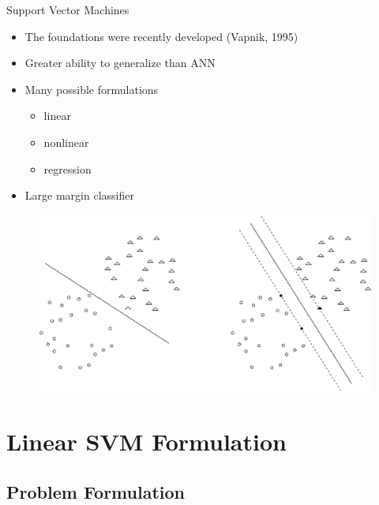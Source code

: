 \documentclass{beamer}
\begin{document}
\begin{frame}{Support Vector Machines}
    \begin{itemize}
        \item The foundations were recently developed (Vapnik, 1995)
        \item Greater ability to generalize than ANN
        \item Many possible formulations
            \begin{itemize}
                \item \alert{linear}
                \item nonlinear
                \item regression
            \end{itemize}
        \item \alert{Large margin} classifier
    \end{itemize}

    \begin{figure}[!htb]
        \centering
        \includegraphics[width=.8\textwidth]{figures/large_margin.eps}
    \end{figure}
\end{frame}


\section{Linear SVM Formulation}

\subsection{Problem Formulation}
\end{document}

